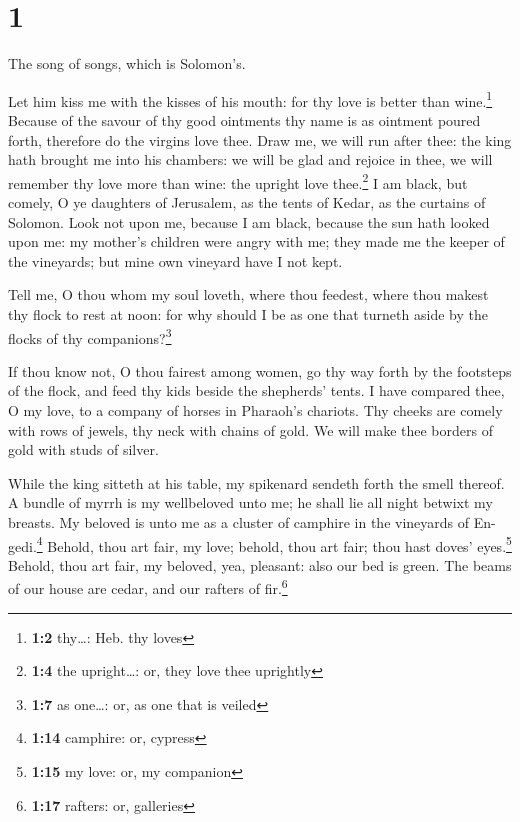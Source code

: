 \hypertarget{section}{%
\section{1}\label{section}}

 The song of songs, which is Solomon's.

 Let him kiss me with the kisses of his mouth: for thy
love is better than wine.\footnote{\textbf{1:2} thy\ldots: Heb. thy
  loves}  Because of the savour of thy good ointments thy
name is as ointment poured forth, therefore do the virgins love thee.
 Draw me, we will run after thee: the king hath brought me
into his chambers: we will be glad and rejoice in thee, we will remember
thy love more than wine: the upright love thee.\footnote{\textbf{1:4}
  the upright\ldots: or, they love thee uprightly}  I am
black, but comely, O ye daughters of Jerusalem, as the tents of Kedar,
as the curtains of Solomon.  Look not upon me, because I
am black, because the sun hath looked upon me: my mother's children were
angry with me; they made me the keeper of the vineyards; but mine own
vineyard have I not kept.

 Tell me, O thou whom my soul loveth, where thou feedest,
where thou makest thy flock to rest at noon: for why should I be as one
that turneth aside by the flocks of thy companions?\footnote{\textbf{1:7}
  as one\ldots: or, as one that is veiled}

 If thou know not, O thou fairest among women, go thy way
forth by the footsteps of the flock, and feed thy kids beside the
shepherds' tents.  I have compared thee, O my love, to a
company of horses in Pharaoh's chariots.  Thy cheeks are
comely with rows of jewels, thy neck with chains of gold.
 We will make thee borders of gold with studs of silver.

 While the king sitteth at his table, my spikenard
sendeth forth the smell thereof.  A bundle of myrrh is my
wellbeloved unto me; he shall lie all night betwixt my breasts.
 My beloved is unto me as a cluster of camphire in the
vineyards of En-gedi.\footnote{\textbf{1:14} camphire: or, cypress}
 Behold, thou art fair, my love; behold, thou art fair;
thou hast doves' eyes.\footnote{\textbf{1:15} my love: or, my companion}
 Behold, thou art fair, my beloved, yea, pleasant: also
our bed is green.  The beams of our house are cedar, and
our rafters of fir.\footnote{\textbf{1:17} rafters: or, galleries}

